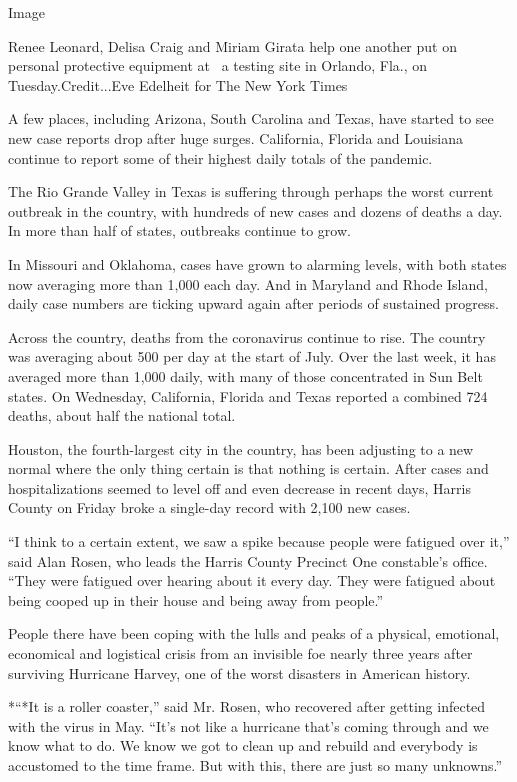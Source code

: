 Image

Renee Leonard, Delisa Craig and Miriam Girata help one another put on
personal protective equipment at~ a testing site in Orlando, Fla., on
Tuesday.Credit...Eve Edelheit for The New York Times

A few places, including Arizona, South Carolina and Texas, have started
to see new case reports drop after huge surges. California, Florida and
Louisiana continue to report some of their highest daily totals of the
pandemic.

The Rio Grande Valley in Texas is suffering through perhaps the worst
current outbreak in the country, with hundreds of new cases and dozens
of deaths a day. In more than half of states, outbreaks continue to
grow.

In Missouri and Oklahoma, cases have grown to alarming levels, with both
states now averaging more than 1,000 each day. And in Maryland and Rhode
Island, daily case numbers are ticking upward again after periods of
sustained progress.

Across the country, deaths from the coronavirus continue to rise. The
country was averaging about 500 per day at the start of July. Over the
last week, it has averaged more than 1,000 daily, with many of those
concentrated in Sun Belt states. On Wednesday, California, Florida and
Texas reported a combined 724 deaths, about half the national total.

Houston, the fourth-largest city in the country, has been adjusting to a
new normal where the only thing certain is that nothing is certain.
After cases and hospitalizations seemed to level off and even decrease
in recent days, Harris County on Friday broke a single-day record with
2,100 new cases.

``I think to a certain extent, we saw a spike because people were
fatigued over it,'' said Alan Rosen, who leads the Harris County
Precinct One constable's office. ``They were fatigued over hearing about
it every day. They were fatigued about being cooped up in their house
and being away from people.''

People there have been coping with the lulls and peaks of a physical,
emotional, economical and logistical crisis from an invisible foe nearly
three years after surviving Hurricane Harvey, one of the worst disasters
in American history.

*``*It is a roller coaster,'' said Mr. Rosen, who recovered after
getting infected with the virus in May. ``It's not like a hurricane
that's coming through and we know what to do. We know we got to clean up
and rebuild and everybody is accustomed to the time frame. But with
this, there are just so many unknowns.''

